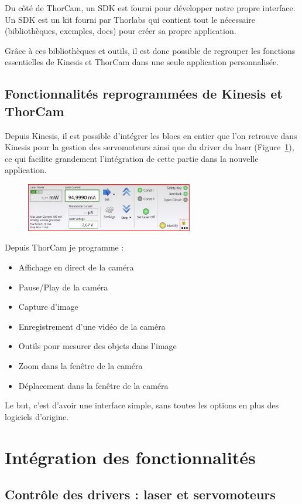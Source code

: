 Du côté de ThorCam, un SDK est fourni pour développer notre propre interface. Un SDK est un kit fourni par Thorlabs qui contient tout le nécessaire (bibliothèques, exemples, docs) pour créer sa propre application.

Grâce à ces bibliothèques et outils, il est donc possible de regrouper les fonctions essentielles de Kinesis et ThorCam dans une seule application personnalisée.

\subsection{Fonctionnalités reprogrammées de Kinesis et ThorCam}


Depuis Kinesis, il est possible d'intégrer les blocs en entier que l'on retrouve dans Kinesis pour la gestion des servomoteurs ainsi que du driver du laser (Figure~\ref{laser_driver}), ce qui facilite grandement l'intégration de cette partie dans la nouvelle application.

\begin{figure}[H]
    \begin{center}
        \includegraphics[width=0.65\textwidth]{assets/figures/Application_ServoVision/Laserdriver.jpeg}
    \end{center}
    \label{laser_driver}
\end{figure}

Depuis ThorCam je programme :
\begin{itemize}[label=\textbullet]
    \item Affichage en direct de la caméra
    \item Pause/Play de la caméra
    \item Capture d'image
    \item Enregistrement d'une vidéo de la caméra
    \item Outils pour mesurer des objets dans l'image
    \item Zoom dans la fenêtre de la caméra
    \item Déplacement dans la fenêtre de la caméra
\end{itemize}

Le but, c'est d'avoir une interface simple, sans toutes les options en plus des logiciels d'origine.

\section{Intégration des fonctionnalités}
\subsection{Contrôle des drivers : laser et servomoteurs}
\subsection{}